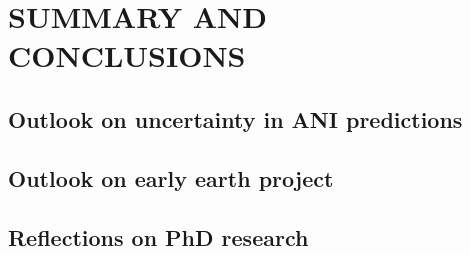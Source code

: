\chapter{SUMMARY AND CONCLUSIONS} \label{conclusion}

\section{Outlook on uncertainty in ANI predictions}

\section{Outlook on early earth project}

\section{Reflections on PhD research}
